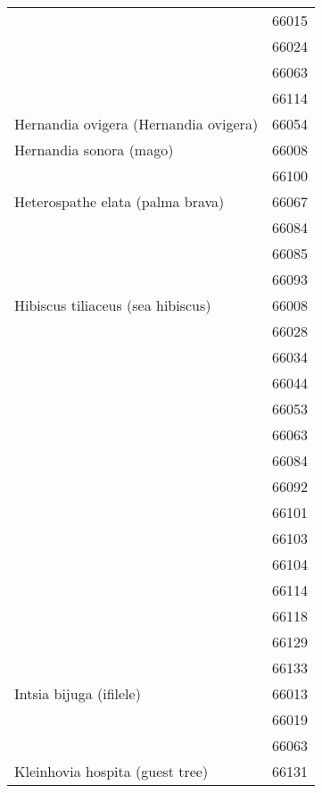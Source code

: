 \begin{longtable}{ll}
                                    & 66015 \\
                                    & 66024 \\
                                    & 66063 \\
                                    & 66114 \\
\midrule
Hernandia ovigera (Hernandia ovigera) & 66054 \\
\midrule
Hernandia sonora (mago) & 66008 \\
                                    & 66100 \\
\midrule
Heterospathe elata (palma brava) & 66067 \\
                                    & 66084 \\
                                    & 66085 \\
                                    & 66093 \\
\midrule
Hibiscus tiliaceus (sea hibiscus) & 66008 \\
                                    & 66028 \\
                                    & 66034 \\
                                    & 66044 \\
                                    & 66053 \\
                                    & 66063 \\
                                    & 66084 \\
                                    & 66092 \\
                                    & 66101 \\
                                    & 66103 \\
                                    & 66104 \\
                                    & 66114 \\
                                    & 66118 \\
                                    & 66129 \\
                                    & 66133 \\
\midrule
Intsia bijuga (ifilele) & 66013 \\
                                    & 66019 \\
                                    & 66063 \\
\midrule
Kleinhovia hospita (guest tree) & 66131 \\

\end{longtable}
